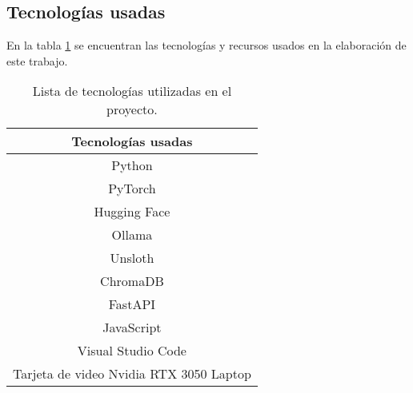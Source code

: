 \documentclass[../main.tex]{subfiles}
\begin{document}
\subsection{Tecnologías usadas}
En la tabla \ref{tab:tecnologias} se encuentran las tecnologías y recursos usados en la elaboración de este trabajo.
\begin{table}[h]
    \centering
    \caption{Lista de tecnologías utilizadas en el proyecto.}
    \label{tab:tecnologias}
    \renewcommand{\arraystretch}{1.2}
    \begin{tabular}{c}
        \hline
        \textbf{Tecnologías usadas} \\
        \hline
        Python \\
        PyTorch \\
        Hugging Face \\
        Ollama \\
        Unsloth \\
        ChromaDB \\
        FastAPI \\
        JavaScript \\
        Visual Studio Code \\
        Tarjeta de video Nvidia RTX 3050 Laptop \\
        \hline
    \end{tabular}

\end{table}
\end{document}
